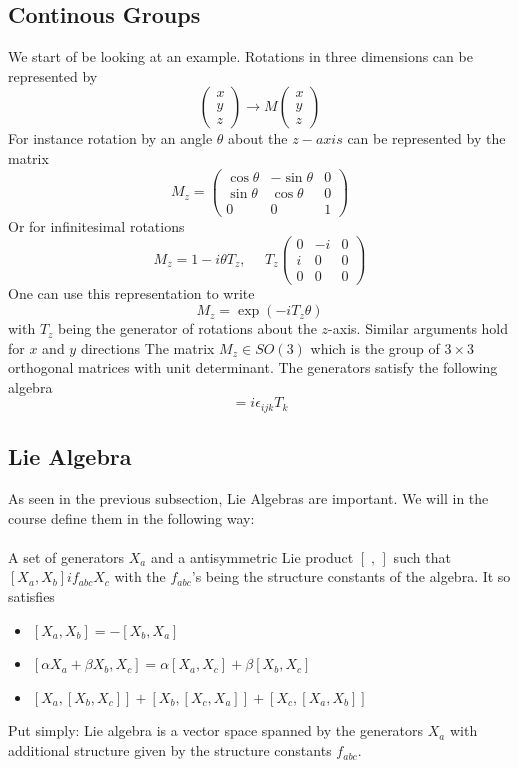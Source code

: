 \documentclass[a4paper,12pt]{article}
\begin{document}
\subsection{Continous Groups}
We start of be looking at an example. Rotations in three dimensions can be represented by
\begin{equation}
\begin{pmatrix}
	x\\
	y\\
	z
\end{pmatrix}\to M
\begin{pmatrix}
	x\\
	y\\
	z
\end{pmatrix}
\end{equation}
For instance rotation by an angle $\theta$ about the $z-axis$ can be represented by the matrix
\begin{equation}M_z=
\begin{pmatrix}
\cos\theta & -\sin \theta & 0\\
\sin \theta & \cos \theta & 0\\
0 & 0 & 1
\end{pmatrix}
\end{equation}
Or for infinitesimal rotations
\begin{equation}
M_z=1-i\theta T_z,~~~~~~T_z\begin{pmatrix}
	0 & -i & 0\\
	i & 0 & 0\\
	0 & 0 & 0
\end{pmatrix}
\end{equation}
One can use this representation to write
\begin{equation}
M_z=\exp(-iT_z\theta)
\end{equation}
with $T_z$ being the generator of rotations about the $z$-axis. Similar arguments hold for $x$ and $y$ directions
The matrix $M_z\in SO(3)$ which is the group of $3\times 3$ orthogonal matrices with unit determinant. The generators satisfy the following algebra
\begin{equation}
[T_i,T_j]=i\epsilon_{ijk}T_k
\end{equation}
\subsection{Lie Algebra}
As seen in the previous subsection, Lie Algebras are important. We will in the course define them in the following way:\\\\
A set of generators $X_a$ and a antisymmetric Lie product $[\;,\,]$ such that $[X_a,X_b]i f_{abc}X_c$ with the $f_{abc}$'s being the structure constants of the algebra. It so satisfies
\begin{itemize}
\item $[X_a,X_b]=-[X_b,X_a]$
\item $[\alpha X_a+\beta X_b,X_c]=\alpha[ X_a,X_c]+\beta [X_b,X_c]$
\item $[X_a,[X_b,X_c]]+[X_b,[X_c,X_a]]+[X_c,[X_a,X_b]]$
\end{itemize}
Put simply: Lie algebra is a vector space spanned by the generators $X_a$ with additional structure given by the structure constants $f_{abc}$.
\end{document}
